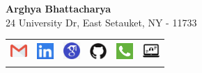 \documentclass[letterpaper,10pt]{article}
\begin{document}
\begin{center}
\textbf{{\Huge Arghya Bhattacharya}} \\
\vspace{5pt}
{24 University Dr, East Setauket, NY - 11733} \\
\bigskip

\begin{tabular*}{\textwidth}{ m{3.5cm} m{3.5cm} m{3.5cm} m{3.5cm} m{3.5cm} m{3.5cm} }
\underline{\href{mailto:argbhattacha@cs.stonybrook.edu}{\includegraphics[width=0.25in,height=0.20in]{Figures/email.png}}} &
\underline{{\href{https://www.linkedin.com/in/arghya-bhattacharya-42522797/}{\includegraphics[width=0.25in,height=0.25in]{Figures/linkedin.png}}}} &
\underline{{\href{https://scholar.google.com/citations?user=tvw7c5wAAAAJ&hl=en}{\includegraphics[width=0.25in,height=0.25in]{Figures/googlescholar.png}}}} &
\underline{{\href{https://github.com/ArghyaB118}{\includegraphics[width=0.25in,height=0.25in]{Figures/github.png}}}} &
\underline{\href{tel:(+1)934-777-9896}{\includegraphics[width=0.25in,height=0.25in]{Figures/call.png}}} &
\underline{\href{https://www3.cs.stonybrook.edu/~argbhattacha/}{\includegraphics[width=0.25in,height=0.30in]{Figures/webpage.png}}} \\
\end{tabular*}
\end{center}
\end{document}
